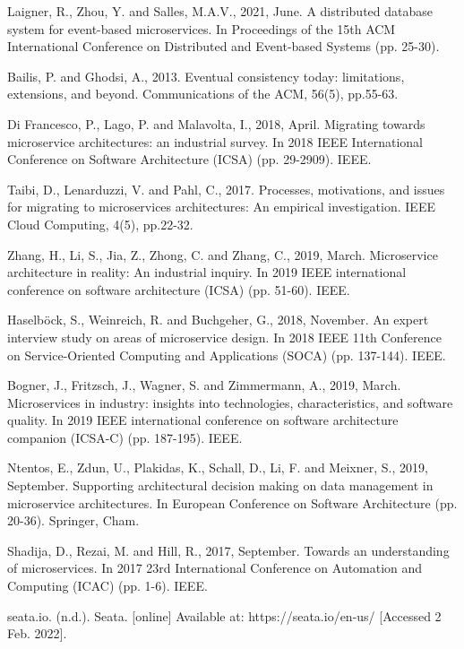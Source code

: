 \documentclass[a4paper,12pt]{article}
\begin{document}
\begin{thebibliography}{}
Laigner, R., Zhou, Y. and Salles, M.A.V., 2021, June. A distributed database system for event-based microservices. In Proceedings of the 15th ACM International Conference on Distributed and Event-based Systems (pp. 25-30).

Bailis, P. and Ghodsi, A., 2013. Eventual consistency today: limitations, extensions, and beyond. Communications of the ACM, 56(5), pp.55-63.

Di Francesco, P., Lago, P. and Malavolta, I., 2018, April. Migrating towards microservice architectures: an industrial survey. In 2018 IEEE International Conference on Software Architecture (ICSA) (pp. 29-2909). IEEE.

Taibi, D., Lenarduzzi, V. and Pahl, C., 2017. Processes, motivations, and issues for migrating to microservices architectures: An empirical investigation. IEEE Cloud Computing, 4(5), pp.22-32.

Zhang, H., Li, S., Jia, Z., Zhong, C. and Zhang, C., 2019, March. Microservice architecture in reality: An industrial inquiry. In 2019 IEEE international conference on software architecture (ICSA) (pp. 51-60). IEEE.

Haselböck, S., Weinreich, R. and Buchgeher, G., 2018, November. An expert interview study on areas of microservice design. In 2018 IEEE 11th Conference on Service-Oriented Computing and Applications (SOCA) (pp. 137-144). IEEE.

Bogner, J., Fritzsch, J., Wagner, S. and Zimmermann, A., 2019, March. Microservices in industry: insights into technologies, characteristics, and software quality. In 2019 IEEE international conference on software architecture companion (ICSA-C) (pp. 187-195). IEEE.

Ntentos, E., Zdun, U., Plakidas, K., Schall, D., Li, F. and Meixner, S., 2019, September. Supporting architectural decision making on data management in microservice architectures. In European Conference on Software Architecture (pp. 20-36). Springer, Cham.

Shadija, D., Rezai, M. and Hill, R., 2017, September. Towards an understanding of microservices. In 2017 23rd International Conference on Automation and Computing (ICAC) (pp. 1-6). IEEE.

seata.io. (n.d.). Seata. [online] Available at: https://seata.io/en-us/ [Accessed 2 Feb. 2022].


\end{thebibliography}
\end{document}
